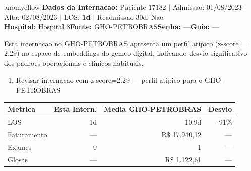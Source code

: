 \documentclass[a4paper,10pt]{article}
\begin{document}
\begin{anomalycard}[Internacao 57846 | GHO-PETROBRAS | MODERADO (z=2.29)]{anomyellow}
\textbf{Dados da Internacao:} Paciente 17182 $\mid$ Admissao: 01/08/2023 $\mid$ Alta: 02/08/2023 $\mid$ LOS: \textbf{1d} $\mid$ Readmissao 30d: Nao\\
\textbf{Hospital:} Hospital 8\quad\textbf{Fonte:} GHO-PETROBRAS\quad\textbf{Senha:} ---\quad\textbf{Guia:} ---\\
\vspace{2pt}\begin{tcolorbox}[colback=severityred!20,colframe=anomyellow,title={\textbf{Interpretacao de Negocio}},fonttitle=\bfseries\small,left=4pt,right=4pt,top=3pt,bottom=3pt]
{\small Esta internacao no GHO-PETROBRAS apresenta um perfil atipico (z-score = 2.29) no espaco de embeddings do gemeo digital, indicando desvio significativo dos padroes operacionais e clinicos habituais.}
\end{tcolorbox}
\begin{tcolorbox}[colback=severityyellow!30,colframe=anomorange,title={\textbf{Recomendacoes Especificas}},fonttitle=\bfseries\small,left=4pt,right=4pt,top=3pt,bottom=3pt]
\begin{enumerate}[nosep,leftmargin=16pt]
\item {\small Revisar internacao com z-score=2.29 --- perfil atipico para o GHO-PETROBRAS}
\end{enumerate}
\end{tcolorbox}
\begin{center}\begin{tabular}{l r r r}\toprule\textbf{Metrica} & \textbf{Esta Intern.} & \textbf{Media GHO-PETROBRAS} & \textbf{Desvio} \\\midrule
LOS & 1d & 10.9d & -91\% \\
Faturamento & --- & R\$ 17.940,12 & --- \\
Exames & 0 & 1 & --- \\
Glosas & --- & R\$ 1.122,61 & --- \\
\bottomrule\end{tabular}\end{center}


\end{anomalycard}
\end{document}
